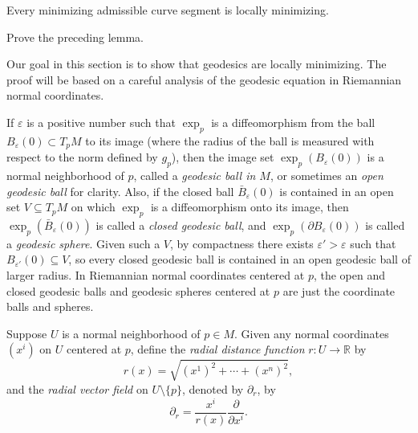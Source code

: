 \begin{lemma}
\label{lem:minimizing-curves-locally-minimizing}

Every minimizing admissible curve segment is locally minimizing.
\end{lemma}

\begin{exercise}
\label{exer:prove-minimizing-lemma}

Prove the preceding lemma.
\end{exercise}

Our goal in this section is to show that geodesics are locally minimizing. The proof will be based on a careful analysis of the geodesic equation in Riemannian normal coordinates.

If $\varepsilon$ is a positive number such that $\exp_p$ is a diffeomorphism from the ball $B_\varepsilon(0) \subset T_p M$ to its image (where the radius of the ball is measured with respect to the norm defined by $g_p$), then the image set $\exp_p(B_\varepsilon(0))$ is a normal neighborhood of $p$, called a \emph{geodesic ball in $M$}, or sometimes an \emph{open geodesic ball} for clarity. Also, if the closed ball $\bar{B}_\varepsilon(0)$ is contained in an open set $V \subseteq T_p M$ on which $\exp_p$ is a diffeomorphism onto its image, then $\exp_p(\bar{B}_\varepsilon(0))$ is called a \emph{closed geodesic ball}, and $\exp_p(\partial B_\varepsilon(0))$ is called a \emph{geodesic sphere}. Given such a $V$, by compactness there exists $\varepsilon' > \varepsilon$ such that $B_{\varepsilon'}(0) \subseteq V$, so every closed geodesic ball is contained in an open geodesic ball of larger radius. In Riemannian normal coordinates centered at $p$, the open and closed geodesic balls and geodesic spheres centered at $p$ are just the coordinate balls and spheres.


Suppose $U$ is a normal neighborhood of $p \in M$. Given any normal coordinates $(x^i)$ on $U$ centered at $p$, define the \emph{radial distance function} $r : U \to \mathbb{R}$ by
\begin{equation}
r(x) = \sqrt{(x^1)^2 + \cdots + (x^n)^2}, \tag{6.4}
\end{equation}
and the \emph{radial vector field} on $U \setminus \{p\}$, denoted by $\partial_r$, by
\begin{equation}
\partial_r = \frac{x^i}{r(x)} \frac{\partial}{\partial x^i}. \tag{6.5}
\end{equation}

